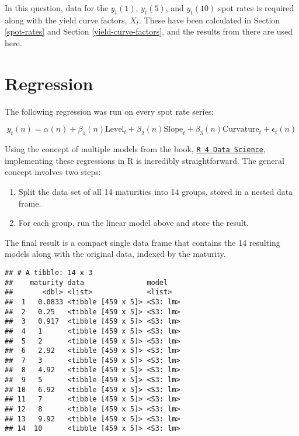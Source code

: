\documentclass[openany]{book}
\providecommand{\tightlist}{%
  \setlength{\itemsep}{0pt}\setlength{\parskip}{0pt}}
\theoremstyle{definition}
\theoremstyle{definition}
\theoremstyle{definition}
\theoremstyle{remark}
\begin{document}
\small

\normalsize

In this question, data for the \(y_t(1)\), \(y_t(5)\), and \(y_t(10)\)
spot rates is required along with the yield curve factors, \(X_t\).
These have been calculated in Section \ref{spot-rates} and Section
\ref{yield-curve-factors}, and the results from there are used here.

\small

\normalsize

\hypertarget{regression}{%
\section{Regression}\label{regression}}

The following regression was run on every spot rate series:

\[ y_{t}(n) = \alpha(n) + \beta_1(n) \text{Level}_t + \beta_2(n) \text{Slope}_t + \beta_3(n) \text{Curvature}_t + \epsilon_t(n) \]

Using the concept of multiple models from the book,
\href{http://r4ds.had.co.nz/many-models.html}{\texttt{R\ 4\ Data\ Science}},
implementing these regressions in R is incredibly straightforward. The
general concept involves two steps:

\begin{enumerate}
\def\labelenumi{\arabic{enumi})}
\tightlist
\item
  Split the data set of all 14 maturities into 14 groups, stored in a
  nested data frame.
\item
  For each group, run the linear model above and store the result.
\end{enumerate}

\small

\normalsize

\small

\normalsize

The final result is a compact single data frame that contains the 14
resulting models along with the original data, indexed by the maturity.

\small

\begin{verbatim}
## # A tibble: 14 x 3
##    maturity data               model   
##       <dbl> <list>             <list>  
##  1   0.0833 <tibble [459 x 5]> <S3: lm>
##  2   0.25   <tibble [459 x 5]> <S3: lm>
##  3   0.917  <tibble [459 x 5]> <S3: lm>
##  4   1      <tibble [459 x 5]> <S3: lm>
##  5   2      <tibble [459 x 5]> <S3: lm>
##  6   2.92   <tibble [459 x 5]> <S3: lm>
##  7   3      <tibble [459 x 5]> <S3: lm>
##  8   4.92   <tibble [459 x 5]> <S3: lm>
##  9   5      <tibble [459 x 5]> <S3: lm>
## 10   6.92   <tibble [459 x 5]> <S3: lm>
## 11   7      <tibble [459 x 5]> <S3: lm>
## 12   8      <tibble [459 x 5]> <S3: lm>
## 13   9.92   <tibble [459 x 5]> <S3: lm>
## 14  10      <tibble [459 x 5]> <S3: lm>
\end{verbatim}
\end{document}
